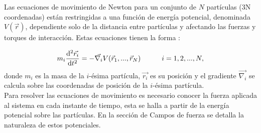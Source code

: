 \documentclass[12pt]{article}
\begin{document}
Las ecuaciones de movimiento de Newton para un conjunto de $N$ partículas (3N coordenadas) están restringidas a una función de energía potencial, denominada $V(\vec{r})$, dependiente solo de la distancia entre partículas y afectando las fuerzas y torques de interacción. Estas ecuaciones tienen la forma \cite{Goldstein2001}:

\begin{equation}\label{eq:1}
m_i\frac{\mathrm{d}^2\vec{r_i}}{\mathrm{d}t^2}=-\vec{\nabla_i}V(\vec{r}_1,...,\vec{r}_N) \text{\hspace{30pt}}i=1,2,...,N,
\end{equation}
donde $m_i$ es la masa de la $i$-ésima partícula, $\vec{r_i}$ es su posición y el gradiente $ \vec{\nabla_i}$ se calcula sobre las coordenadas de posición de la $i$-ésima partícula.\\

Para resolver las ecuaciones de movimiento es necesario conocer la fuerza aplicada al sistema en cada instante de tiempo, esta se halla a partir de la energía potencial sobre las partículas. En la sección de Campos de fuerza se detalla la naturaleza de estos potenciales.
\end{document}
